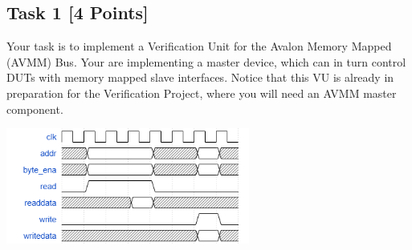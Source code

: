 \documentclass[12pt,epsf,makeidx,oneside]{book}
\begin{document}
  \subsection{Task 1 [4 Points]}
  Your task is to implement a Verification Unit for the Avalon Memory Mapped (AVMM) Bus. Your are
  implementing a master device, which can in turn control DUTs with memory mapped slave interfaces.
  Notice that this VU is already in preparation for the Verification Project, where you will need
  an AVMM master component.
  \begin{center}
    \includegraphics[width=0.6\textwidth]{avmm_timing}
  \end{center}
\end{document}

